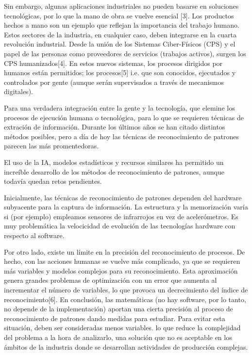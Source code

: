 \documentclass{article}
\begin{document}
  Sin embargo, algunas aplicaciones industriales no pueden basarse en soluciones tecnológicas, por lo que la mano de obra se vuelve esencial [3].  Los productos hechos a mano son un ejemplo que reflejan la importancia del trabajo humano. Estos sectores de la industria, en cualquier caso, deben integrarse en la cuarta revolución industrial. Desde la unión de los Sistemas Ciber-Físicos (CPS) y el papel de las personas como proveedores de servicios (trabajos activos), surgen los CPS humanizados[4]. En estos nuevos sistemas, los procesos dirigidos por humanos están permitidos; los procesos[5] i.e. que son conocidos, ejecutados y controlados por gente (aunque serán supervisados a través de mecanismos digitales).

  Para una verdadera integración entre la gente y la tecnología, que elemine los procesos de ejecución humana o tecnológica, para lo que se requieren técnicas de extración de información. Durante los últimos años se han citado distintos métodos posibles, pero a día de hoy las técnicas de reconocimiento de patrones parecen las más promentedoras.

  El uso de la IA, modelos estadísticos y recursos similares ha permitido un increíble desarrollo de los métodos de reconocimiento de patrones, aunque todavía quedan retos pendientes.

  Inicialmente, las técnicas de reconocimiento de patrones dependen del hardware subyacente para la captura de información. La estructura y la memorización varía si (por ejemplo)   empleamos sensores de infrarrojos en vez de acelerómetros. Es muy problemática la velocicidad de evolución de las tecnologías hardware con respecto al software.

  Por otro lado, existe un límite en la precisión del reconocimiento de procesos. De hecho, con las acciones humanas se vuelve más complicado, ya que se requieren más variables y modelos complejos para su reconocimiento. Esta aproximación genera grandes problemas de optimización con un error que aumenta al incrementar el número de variables, lo que provoca un decrecimiento del índice de reconocimiento[6]. En conclusión, las matemáticas (no hay software, por lo tanto, no depende de la implementación) aportan una cierta precisión al proceso de reconocimiento de patrones dando medidas para estudiar. Para evitar esta situación, deben ser consideradas menos variables. lo que reduce la complejidad del problema a la hora de analizarlo, una solución que no es aceptable en los ámbitos de la industria donde se desarrollan actividades de producción complejas.
\end{document}
